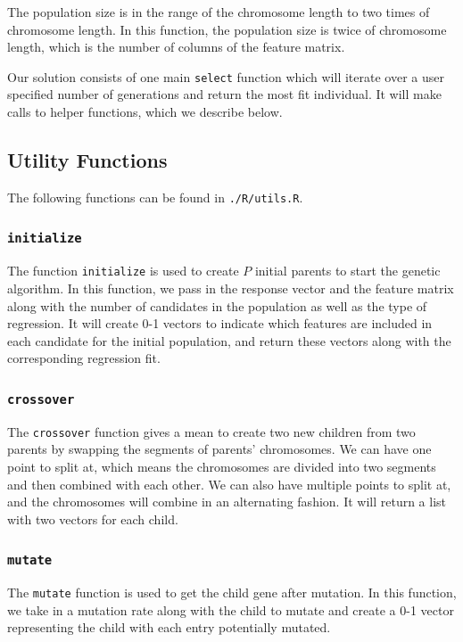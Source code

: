 \documentclass{article}\usepackage[]{graphicx}\usepackage[]{color}
\begin{document}
The population size is in the range of the chromosome length to two times of chromosome length. In this function, the population size is twice of chromosome length, which is the number of columns of the feature matrix.

Our solution consists of one main \texttt{select} function which will iterate over a user specified number of generations and return the most fit individual. It will make calls to helper functions, which we describe below.

\subsection{Utility Functions}
The following functions can be found in \texttt{./R/utils.R}.

\subsubsection{\texttt{initialize}}
The function \texttt{initialize} is used to create $P$ initial parents to start the genetic algorithm. In this function, we pass in the response vector and the feature matrix along with the number of candidates in the population as well as the type of regression. It will create 0-1 vectors to indicate which features are included in each candidate for the initial population, and return these vectors along with the corresponding regression fit.

\subsubsection{\texttt{crossover}}
The \texttt{crossover} function gives a mean to create two new children from two parents by swapping the segments of parents' chromosomes. We can have one point to split at, which means the chromosomes are divided into two segments and then combined with each other. We can also have multiple points to split at, and the chromosomes will combine in an alternating fashion. It will return a list with two vectors for each child.

\subsubsection{\texttt{mutate}}
The \texttt{mutate} function is used to get the child gene after mutation. In this function, we take in a mutation rate along with the child to mutate and create a 0-1 vector representing the child with each entry potentially mutated.
\end{document}
